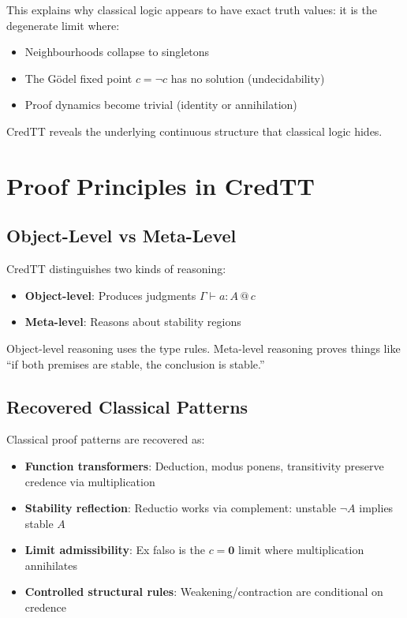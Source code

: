 \documentclass[11pt,a4paper]{article}
\makeatletter
\newcommand{\at}[1]{\,@\,#1}
\newcommand{\zero}{\mathbf{0}}
\newcommand{\negc}{\neg}
\makeatother
\begin{document}
This explains why classical logic appears to have exact truth values: it is the degenerate limit where:
\begin{itemize}
    \item Neighbourhoods collapse to singletons
    \item The G\"odel fixed point $c = \negc c$ has no solution (undecidability)
    \item Proof dynamics become trivial (identity or annihilation)
\end{itemize}

CredTT reveals the underlying continuous structure that classical logic hides.

\section{Proof Principles in CredTT}

\subsection{Object-Level vs Meta-Level}

CredTT distinguishes two kinds of reasoning:
\begin{itemize}
    \item \textbf{Object-level}: Produces judgments $\Gamma \vdash a : A \at{c}$
    \item \textbf{Meta-level}: Reasons about stability regions
\end{itemize}

Object-level reasoning uses the type rules. Meta-level reasoning proves things like ``if both premises are stable, the conclusion is stable.''

\subsection{Recovered Classical Patterns}

Classical proof patterns are recovered as:
\begin{itemize}
    \item \textbf{Function transformers}: Deduction, modus ponens, transitivity preserve credence via multiplication
    \item \textbf{Stability reflection}: Reductio works via complement: unstable $\negc A$ implies stable $A$
    \item \textbf{Limit admissibility}: Ex falso is the $c = \zero$ limit where multiplication annihilates
    \item \textbf{Controlled structural rules}: Weakening/contraction are conditional on credence
\end{itemize}
\end{document}
